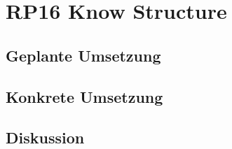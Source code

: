 \section{RP16 Know Structure}
\label{sec:principle-rp16-know-structure}

\subsection*{Geplante Umsetzung}


\subsection*{Konkrete Umsetzung}


\subsection*{Diskussion}
